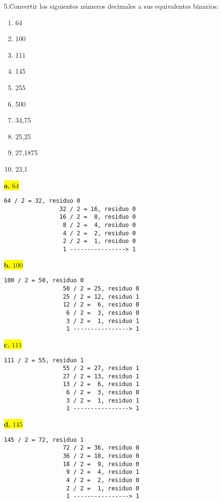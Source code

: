 \documentclass[a4paper,12pt]{article}
\begin{document}
	5.Convertir los siguientes números decimales a sus equivalentes binarios:
		\begin{enumerate}
			\item 64 
			\item 100 
			\item 111 
			\item 145 
			\item 255 
			\item 500 
			\item 34,75 
			\item 25,25 
			\item 27,1875 
			\item 23,1
		\end{enumerate}
	
		
		\begin{center}
			\colorbox{yellow}{{\textbf{a.} $64$}}
			\begin{Verbatim}[formatcom=\centering]
				64 / 2 = 32, residuo 0
				32 / 2 = 16, residuo 0
				16 / 2 =  8, residuo 0
				 8 / 2 =  4, residuo 0
				 4 / 2 =  2, residuo 0
				 2 / 2 =  1, residuo 0
				 1 ----------------> 1
			\end{Verbatim}
		\hspace{1.7cm}
		\end{center}
		\begin{center}
			\colorbox{yellow}{{\textbf{b.} $100$}}
			\begin{Verbatim}[formatcom=\centering]
				100 / 2 = 50, residuo 0
				 50 / 2 = 25, residuo 0
				 25 / 2 = 12, residuo 1
				 12 / 2 =  6, residuo 0
				  6 / 2 =  3, residuo 0
				  3 / 2 =  1, residuo 1
				  1 ----------------> 1
			\end{Verbatim}
			\hspace{1.7cm}
		\end{center}
		\begin{center}
			\colorbox{yellow}{{\textbf{c.} $111$}}
			\begin{Verbatim}[formatcom=\centering]
				111 / 2 = 55, residuo 1
				 55 / 2 = 27, residuo 1
				 27 / 2 = 13, residuo 1
				 13 / 2 =  6, residuo 1
				  6 / 2 =  3, residuo 0
				  3 / 2 =  1, residuo 1
				  1 ----------------> 1
			\end{Verbatim}
			\hspace{1.7cm}
		\end{center}
		\begin{center}
			\colorbox{yellow}{{\textbf{d.} $145$}}
			\begin{Verbatim}[formatcom=\centering]
				145 / 2 = 72, residuo 1
				 72 / 2 = 36, residuo 0
				 36 / 2 = 18, residuo 0
				 18 / 2 =  9, residuo 0
				  9 / 2 =  4, residuo 1
			   	  4 / 2 =  2, residuo 0
			   	  2 / 2 =  1, residuo 0
				  1 ----------------> 1
			\end{Verbatim}
			\hspace{1.7cm}
		\end{center}
\end{document}
